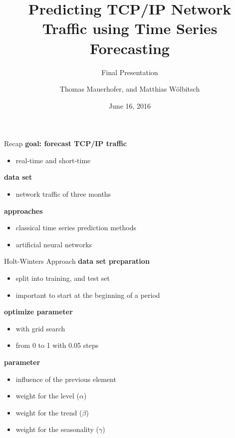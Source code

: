 \documentclass{beamer}
\title{Predicting TCP/IP Network Traffic using Time Series Forecasting}
\subtitle{Final Presentation}
\date{June 16, 2016}
\author{Thomas Mauerhofer, and Matthias Wölbitsch}
\begin{document}
  \maketitle
  
  \begin{frame}{Recap}   
    \textbf{goal: forecast TCP/IP traffic}
    \begin{itemize}
     \item real-time and short-time
    \end{itemize}
    
    \textbf{data set}
    \begin{itemize}
     \item network traffic of three months
    \end{itemize}
    
    \textbf{approaches}
    \begin{itemize}
     \item classical time series prediction methods
     \item artificial neural networks
    \end{itemize}
  \end{frame}
  
  \begin{frame}{Holt-Winters Approach}
    \textbf{data set preparation}
    \begin{itemize}
      \item split into training, and test set
      \item important to start at the beginning of a period
    \end{itemize}
    
    \textbf{optimize parameter}
    \begin{itemize}
     \item with grid search
     \item from 0 to 1 with 0.05 steps
    \end{itemize}
    
    \textbf{parameter}
    \begin{itemize}
      \item influence of the previous element
      \item weight for the level ($\alpha$)
      \item weight for the trend ($\beta$)
      \item weight for the seasonality ($\gamma$)
    \end{itemize}
  \end{frame}
  
\end{document}
